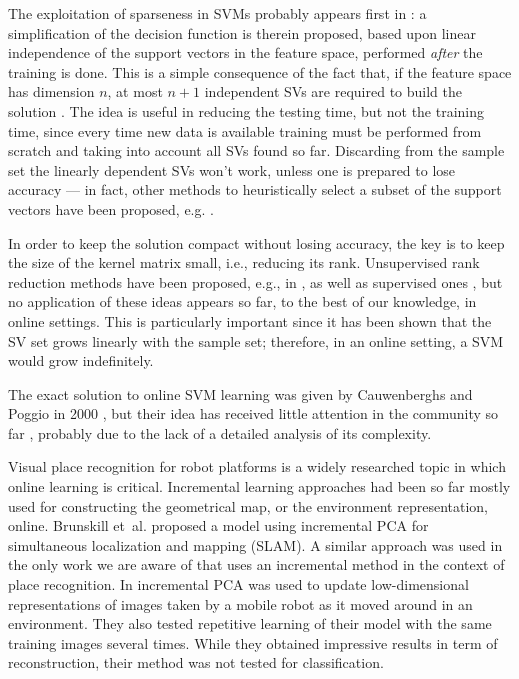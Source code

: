 The exploitation of sparseness in SVMs probably appears first in
\cite{DownsGM01}: a simplification of the decision function is therein
proposed, based upon linear independence of the support vectors in the
feature space, performed \emph{after} the training is done. This is a
simple consequence of the fact that, if the feature space has
dimension $n$, at most $n+1$ independent SVs are required to build the
solution \cite{PontilV98}. The idea is useful in reducing the testing
time, but not the training time, since every time new data is
available training must be performed from scratch and taking into
account all SVs found so far. Discarding from the sample set the
linearly dependent SVs won't work, unless one is prepared to lose
accuracy --- in fact, other methods to heuristically select a subset
of the support vectors have been proposed,
e.g. \cite{LeeM01,schoel06,KeerthiCDC06}.

In order to keep the solution compact without losing accuracy, the key
is to keep the size of the kernel matrix small, i.e., reducing its
rank. Unsupervised rank reduction methods have been proposed, e.g., in
\cite{KeerthiCDC06}, as well as supervised ones
\cite{Baudat03,BachJordan2005}, but no application of these ideas
appears so far, to the best of our knowledge, in online settings. This
is particularly important since it has been shown \cite{Steinwart03}
that the SV set grows linearly with the sample set; therefore, in an
online setting, a SVM would grow indefinitely.

The exact solution to online SVM learning was given by Cauwenberghs
and Poggio in 2000 \cite{CauwenberghsP00}, but their idea has received
little attention in the community so far \cite{Laskov2006}, probably
due to the lack of a detailed analysis of its complexity.

Visual place recognition for robot platforms is a widely researched
topic in which online learning is critical. Incremental learning
approaches had been so far mostly used for constructing the
geometrical map, or the environment representation, online.  Brunskill
et~al. \cite{emma:irca05} proposed a model using incremental PCA for
simultaneous localization and mapping (SLAM). A similar approach was
used in the only work we are aware of that uses an incremental method
in the context of place recognition. In \cite{ljubjiana:icra02}
incremental PCA was used to update low-dimensional representations of
images taken by a mobile robot as it moved around in an
environment. They also tested repetitive learning of their model with
the same training images several times. While they obtained impressive
results in term of reconstruction, their method was not tested for
classification.
